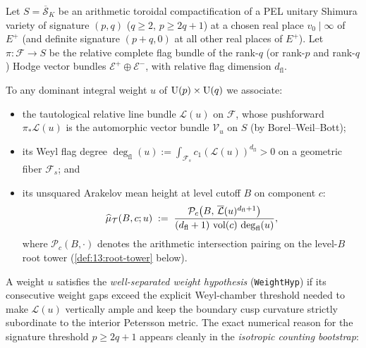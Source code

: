 Let $S = \overline{\mathcal{S}}_K$ be an arithmetic toroidal compactification of a PEL unitary Shimura variety of signature $(p, q)$ ($q \ge 2$, $p \ge 2q + 1$) at a chosen real place $v_0 \mid \infty$ of $E^+$ (and definite signature $(p+q, 0)$ at all other real places of $E^+$). Let $\pi : \mathcal{F} \to S$ be the relative complete flag bundle of the rank-$q$ (or rank-$p$ and rank-$q$) Hodge vector bundles $\mathcal{E}^+ \oplus \mathcal{E}^-$, with relative flag dimension $d_{\mathrm{fl}}$.

To any dominant integral weight $u$ of $\mathrm{U}(p) \times \mathrm{U}(q)$ we associate:
\begin{itemize}
\item the tautological relative line bundle $\mathcal{L}(u)$ on $\mathcal{F}$, whose pushforward $\pi_* \mathcal{L}(u)$ is the automorphic vector bundle $\mathcal{V}_u$ on $S$ (by Borel--Weil--Bott);
\item its Weyl flag degree $\deg_{\mathrm{fl}}(u) := \int_{\mathcal{F}_s} c_1(\mathcal{L}(u))^{d_{\mathrm{fl}}} > 0$ on a geometric fiber $\mathcal{F}_s$; and
\item its unsquared Arakelov mean height at level cutoff $B$ on component $c$:
  \begin{equation}
  \label{eq:13:mean-height}
    \widehat{\mu}_{\mathcal{T}}(B, c; u) \;:=\; \frac{\mathcal{P}_c\bigl(B,\, \overline{\mathcal{L}}(u)^{d_{\mathrm{fl}} + 1}\bigr)}{(d_{\mathrm{fl}} + 1)\,\operatorname{vol}(c)\,\deg_{\mathrm{fl}}(u)},
  \end{equation}
  where $\mathcal{P}_c(B, \cdot)$ denotes the arithmetic intersection pairing on the level-$B$ root tower (\cref{def:13:root-tower} below).
\end{itemize}

A weight $u$ satisfies the \emph{well-separated weight hypothesis} (\texttt{WeightHyp}) if its consecutive weight gaps exceed the explicit Weyl-chamber threshold needed to make $\mathcal{L}(u)$ vertically ample and keep the boundary cusp curvature strictly subordinate to the interior Petersson metric. The exact numerical reason for the signature threshold $p \ge 2q + 1$ appears cleanly in the \emph{isotropic counting bootstrap}:

